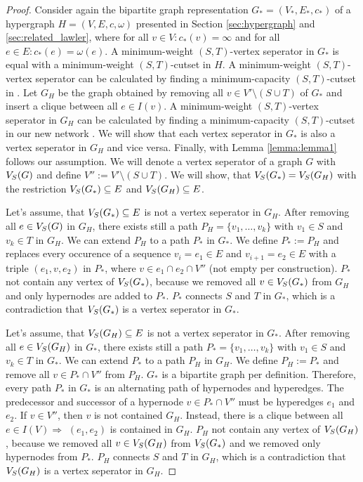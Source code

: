 \begin{proof}

Consider again the bipartite graph representation $G_* = (V_*,E_*,c_*)$ 
of a hypergraph $H = (V,E,c,\omega)$ presented in Section \ref{sec:hypergraph} and \ref{sec:related_lawler}, 
where for all $v \in V: c_*(v) = \infty$ and for all $e \in E: c_*(e) = 
\omega(e)$. A minimum-weight $(S,T)$-vertex seperator in $G_*$ is equal
with a minimum-weight $(S,T)$-cutset in $H$. A minimum-weight $(S,T)$-vertex seperator can be calculated
by finding a minimum-capacity $(S,T)$-cutset in . Let $G_H$ be the graph obtained by removing
all $v \in V'\setminus (S \cup T)$ of $G_*$ and insert a clique between all $e \in I(v)$. 
A minimum-weight $(S,T)$-vertex seperator in $G_H$ can be calculated by finding a 
minimum-capacity $(S,T)$-cutset in our new network .
We will show that each vertex seperator in $G_*$ is also a vertex seperator in $G_H$ and
vice versa. Finally, with Lemma \ref{lemma:lemma1} follows our assumption. We will 
denote a vertex seperator of a graph $G$ with $V_S(G)$ and define $V'' := V' \setminus (S \cup T)$. 
We will show, that $V_S(G_*) = V_S(G_H)$ with the restriction $V_S(G_*) \subseteq E$ and
$V_S(G_H) \subseteq E$.

Let's assume, that $V_S(G_*) \subseteq E$ is not a vertex seperator in $G_H$. After removing all $e \in V_S(G)$ in
$G_H$, there exists still a path $P_H = \{v_1, \ldots, v_k\}$ with $v_1 \in S$ and
$v_k \in T$ in $G_H$. We can extend $P_H$ to a path $P_*$ in $G_*$.
We define $P_* := P_H$ and replaces every occurence of a sequence $v_i = e_1 \in E$ and
$v_{i+1} = e_2 \in E$ with a triple $(e_1,v,e_2)$ in $P_*$, where $v \in e_1 \cap e_2 \cap V''$
(not empty per construction). $P_*$ not contain any vertex of $V_S(G_*)$, because
we removed all $v \in V_S(G_*)$ from $G_H$ and only hypernodes are added to $P_*$. $P_*$ connects $S$ and 
$T$ in $G_*$, which is a contradiction that $V_S(G_*)$ is a vertex seperator in $G_*$.

Let's assume, that $V_S(G_H) \subseteq E$ is not a vertex seperator in $G_*$. After removing all $e \in V_S(G_H)$ in
$G_*$, there exists still a path $P_* = \{v_1, \ldots, v_k\}$ with $v_1 \in S$ and
$v_k \in T$ in $G_*$. We can extend $P_*$ to a path $P_H$ in $G_H$.
We define $P_H := P_*$ and remove all $v \in P_* \cap V''$ from $P_H$. $G_*$ is a bipartite
graph per definition. Therefore, every path $P_*$ in $G_*$ is an alternating path of hypernodes and
hyperedges. The predecessor and successor of a hypernode $v \in P_* \cap V''$ must be hyperedges
$e_1$ and $e_2$. If $v \in V''$, then $v$ is not contained $G_H$. Instead, there is
a clique between all $e \in I(V) \Rightarrow$ $(e_1,e_2)$ is contained in $G_H$.
$P_H$ not contain any vertex of $V_S(G_H)$, because we removed all $v \in V_S(G_H)$ from $V_S(G_*)$ 
and we removed only hypernodes from $P_*$. $P_H$ connects $S$ and $T$ in $G_H$, which is a contradiction 
that $V_S(G_H)$ is a vertex seperator in $G_H$.


\end{proof}
